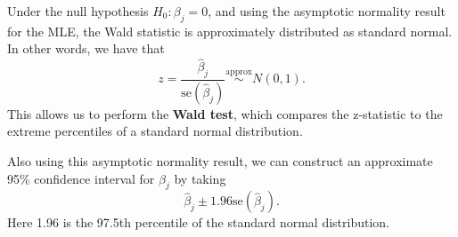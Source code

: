 \documentclass[
  a4paper,
  DIV=11,
  numbers=noendperiod]{scrreprt}
\newcommand{\term}[1]{\textbf{#1}}
\begin{document}
Under the null hypothesis \(H_0: \beta_j=0\), and using the asymptotic
normality result for the MLE, the Wald statistic is approximately
distributed as standard normal. In other words, we have that \[
z=\frac{\hat{\beta}_j}{\text{se}(\hat{\beta}_j)} \overset{\text{approx}}{\sim} N(0,1).
\] This allows us to perform the \term{Wald test}, which compares the
z-statistic to the extreme percentiles of a standard normal
distribution.

Also using this asymptotic normality result, we can construct an
approximate 95\% confidence interval for \(\beta_j\) by taking \[
\hat{\beta}_j\pm 1.96\text{se}(\hat{\beta}_j).
\] Here 1.96 is the 97.5th percentile of the standard normal
distribution.

\label{hypothesis-test-and-confidence-interval-for-the-gpa-coefficient-in-the-model-for-medical-school-admissions}
\end{document}
